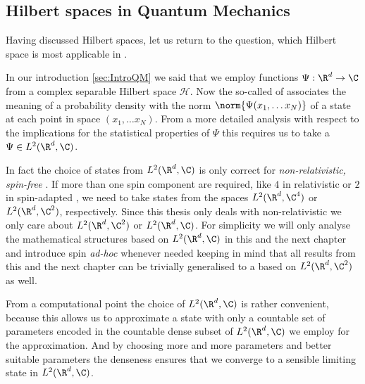 \subsection{Hilbert spaces in Quantum Mechanics}

Having discussed Hilbert spaces, let us return to the question,
which Hilbert space is most applicable in \QM.

In our introduction \vref{sec:IntroQM} we said that
we employ functions $\Psi : \R^d \to \C$ from a
complex separable Hilbert space $\mathcal{H}$.
Now the so-called  of \QM
associates the meaning of a probability density
with the norm $\norm{\Psi(x_1, \ldots x_N)}$
of a state at each point in space $(x_1, \ldots x_N)$.
From a more detailed analysis with respect to the implications
for the statistical properties of $\Psi$
this requires us to take a $\Psi \in L^2(\R^d, \C)$.

In fact the choice of states from $L^2(\R^d, \C)$
is only correct for \emph{non-relativistic, spin-free} \QM.
If more than one spin component are required,
like $4$ in relativistic \QM or $2$ in spin-adapted \QM,
we need to take states from the spaces $L^2(\R^d, \C^4)$ or $L^2(\R^d, \C^2)$,
respectively.
Since this thesis only deals with non-relativistic \QM
we only care about $L^2(\R^d, \C^2)$ or $L^2(\R^d, \C)$.
For simplicity we will only analyse the mathematical structures
based on $L^2(\R^d, \C)$ in this and the next chapter
and introduce spin \textit{ad-hoc} whenever needed
keeping in mind that all results from this and the next chapter
can be trivially generalised to a \QM based on $L^2(\R^d, \C^2)$ as well.

From a computational point the choice of $L^2(\R^d, \C)$ is rather convenient,
because this allows us to approximate a \QM state with only a countable
set of parameters
encoded in the countable dense subset of $L^2(\R^d, \C)$ we employ for the
approximation.
And by choosing more and more parameters and better suitable parameters
the denseness ensures that we converge to a sensible limiting state
in $L^2(\R^d, \C)$.

